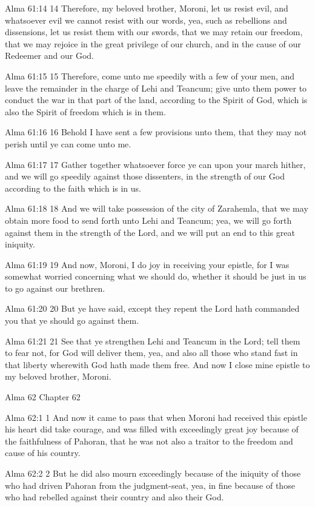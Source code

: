 Alma 61:14
 14 Therefore, my beloved brother, Moroni, let us resist evil,
and whatsoever evil we cannot resist with our words, yea, such as
rebellions and dissensions, let us resist them with our swords,
that we may retain our freedom, that we may rejoice in the great
privilege of our church, and in the cause of our Redeemer and our
God.

Alma 61:15
 15 Therefore, come unto me speedily with a few of your men, and
leave the remainder in the charge of Lehi and Teancum; give unto
them power to conduct the war in that part of the land, according
to the Spirit of God, which is also the Spirit of freedom which
is in them.

Alma 61:16
 16 Behold I have sent a few provisions unto them, that they may
not perish until ye can come unto me.

Alma 61:17
 17 Gather together whatsoever force ye can upon your march
hither, and we will go speedily against those dissenters, in the
strength of our God according to the faith which is in us.

Alma 61:18
 18 And we will take possession of the city of Zarahemla, that we
may obtain more food to send forth unto Lehi and Teancum; yea, we
will go forth against them in the strength of the Lord, and we
will put an end to this great iniquity.

Alma 61:19
 19 And now, Moroni, I do joy in receiving your epistle, for I
was somewhat worried concerning what we should do, whether it
should be just in us to go against our brethren.

Alma 61:20
 20 But ye have said, except they repent the Lord hath commanded
you that ye should go against them.

Alma 61:21
 21 See that ye strengthen Lehi and Teancum in the Lord; tell
them to fear not, for God will deliver them, yea, and also all
those who stand fast in that liberty wherewith God hath made them
free. And now I close mine epistle to my beloved brother,
Moroni.

Alma 62
Chapter 62

Alma 62:1
 1 And now it came to pass that when Moroni had received this
epistle his heart did take courage, and was filled with
exceedingly great joy because of the faithfulness of Pahoran,
that he was not also a traitor to the freedom and cause of his
country.

Alma 62:2
 2 But he did also mourn exceedingly because of the iniquity of
those who had driven Pahoran from the judgment-seat, yea, in fine
because of those who had rebelled against their country and also
their God.

